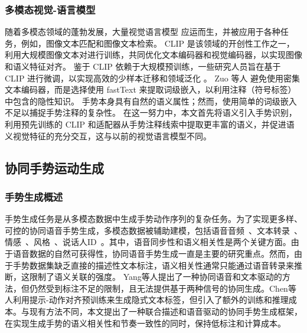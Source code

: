 \subsubsection{多模态视觉-语言模型}
随着多模态领域的蓬勃发展，大量视觉语言模型 \cite{radford2021learning, li2022blip} 应运而生，并被应用于各种任务，例如，图像文本匹配和图像文本检索。
CLIP \cite{radford2021learning} 是该领域的开创性工作之一，利用大规模图像文本对进行训练，共同优化文本编码器和视觉编码器，以实现图像和语义特征对齐。
鉴于 CLIP 依赖于大规模预训练，一些研究人员旨在基于 CLIP 进行微调，以实现高效的少样本迁移和领域泛化 \cite{gao2024clip}。
Zuo 等人 \cite{zuo2023natural} 避免使用密集文本编码器，而是选择使用 fastText 来提取词级嵌入，以利用注释（符号标签）中包含的隐性知识。
手势本身具有自然的语义属性；然而，使用简单的词级嵌入不足以捕捉手势注释的复杂性。
在这一努力中，本文首先将语义引入手势识别，利用预先训练的 CLIP 和适配器从手势注释线索中提取更丰富的语义，并促进语义视觉特征的充分交互，这与以前的视觉语言模型不同。





\subsection{协同手势运动生成}

\subsubsection{手势生成概述}
手势生成任务是从多模态数据中生成手势动作序列的复杂任务。为了实现更多样、可控的协同语音手势生成，多模态数据被辅助建模，包括语音音频~\cite{yang2023diffusestylegesture, yang2023unifiedgesture,xu2025mambatalk}、文本转录~\cite{zhi2023livelyspeaker, pang2023bodyformer,liu2024emage}、情感~\cite{qi2024emotiongesture, qi2024weakly}、风格~\cite{ao2023gesturediffuclip, yang2023diffusestylegesture, ghorbani2023zeroeggs}、说话人ID~\cite{yang2023diffusestylegesture+}。其中，语音同步性和语义相关性是两个关键方面。由于语音数据的自然可获得性，协同语音手势生成一直是主要的研究重点。然而，由于手势数据集缺乏直接的描述性文本标注，语义相关性通常只能通过语音转录来推断，这限制了语义关联的强度。
Yang等人\cite{yang2024freetalker}提出了一种协同语音和文本驱动的方法，但仍然受到标注不足的限制，且无法提供基于两种信号的协同生成。Chen等人\cite{chen2024syntalker}利用提示-动作对齐预训练来生成隐式文本标签，但引入了额外的训练和推理成本。与现有方法不同，本文提出了一种联合描述和语音驱动的协同手势生成框架，在实现生成手势的语义相关性和节奏一致性的同时，保持低标注和计算成本。

